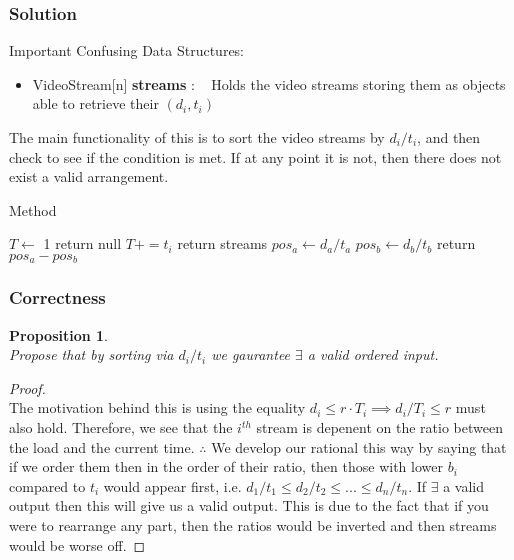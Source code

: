 \documentclass[12pt]{article}
\newtheorem{proposition}[theorem]{Proposition}
\begin{document}
\subsubsection{Solution}
Important Confusing Data Structures:
\begin{itemize}
    \item VideoStream[n] \textbf{streams} : ~ Holds the video streams
    storing them as objects able to retrieve their $(d_i, t_i)$
\end{itemize}

\noindent The main functionality of this is to sort the video streams
by $d_i/t_i$, and then check to see if the condition is met. If at
any point it is not, then there does not exist a valid arrangement.

\begin{algorithm}[H]
\caption{Method}
\begin{algorithmic}
        \State {}
        \State $T \gets$ 1
                \State return null
            \EndIf
            \State $T += t_i$
        \EndFor
        \State return streams
    \EndProcedure
        \State $pos_a \gets d_a/t_a$
        \State $pos_b \gets d_b/t_b$
        \State return $pos_a - pos_b$
    \EndProcedure
\end{algorithmic}
\end{algorithm}



\subsubsection{Correctness}
\begin{proposition}
~ \\ \indent Propose that by sorting via $d_i/t_i$ we gaurantee
$\exists$ a valid ordered input.
\end{proposition}

\begin{proof}
~ \\ \indent The motivation behind this is using the equality
$d_i \leq r\cdot T_i \implies d_i/T_i \leq r$ must also hold. Therefore,
we see that the $i^{th}$ stream is depenent on the ratio between the
load and the current time. $\therefore$ We develop our rational this
way by saying that if we order them then in the order of their
ratio, then those with lower $b_i$ compared to $t_i$ would appear
first, i.e. $d_1/t_1 \leq d_2/t_2 \leq ... \leq d_n/t_n$. If $\exists$
a valid output then this will give us a valid output. This is due
to the fact that if you were to rearrange any part, then the ratios
would be inverted and then streams would be worse off.
\end{proof}
\end{document}
